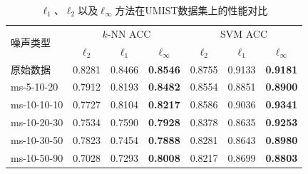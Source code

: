     \begin{table}[!t]
        \vspace{-0.5em}
        \caption{\mbox{$\ell_{1}$、$\ell_{2}$以及$\ell_{\infty}$方法在UMIST数据集上的性能对比}}
        \label{tab:umist}
        \centering
            \begin{tabular}{lcccccc}
    \hline
    \multirow{2}{*}{噪声类型} & \multicolumn{3}{c}{$k$-NN ACC}                          & \multicolumn{3}{c}{SVM ACC}                                                    \\ \cline{2-7}
                           & $\ell_2$ & $\ell_1$ & \multicolumn{1}{c}{$\ell_\infty$} & $\ell_2$ & $\ell_1$                         & $\ell_\infty$                    \\ \hline
    原始数据               & 0.8281   & 0.8466   & \textbf{0.8546}        & 0.8755   & 0.9133                           & \textbf{0.9181} \\
    ms-5-10-20 & 0.7912 & 0.8193 & \textbf{0.8482} & 0.8554 & 0.8851 & \textbf{0.8900} \\
    ms-10-10-10 & 0.7727 & 0.8104 & \textbf{0.8217} & 0.8586 & 0.9036 & \textbf{0.9341} \\
    ms-10-20-30                  & 0.7534   & 0.7590   & \textbf{0.7928}  & 0.8378   & 0.8635                           & \textbf{0.9253} \\
    ms-10-30-50  & 0.7823 & 0.7454 & \textbf{0.7888} & 0.8281 & 0.8643 & \textbf{0.8980} \\
    ms-10-50-90                  & 0.7028   & 0.7293   & \textbf{0.8008}  & 0.8217   & 0.8699                           & \textbf{0.8803} \\

\end{tabular}
\end{table}
